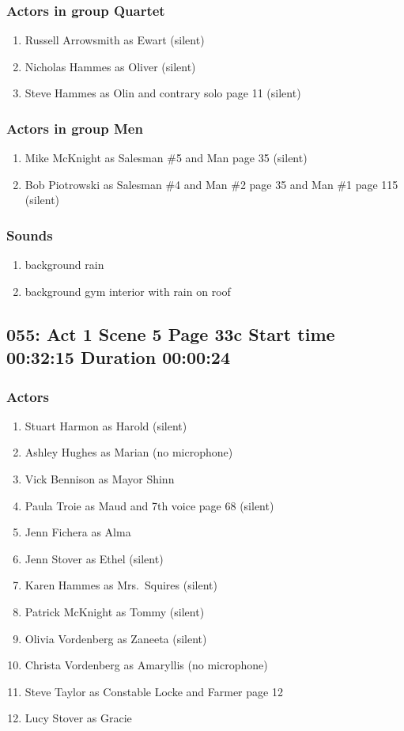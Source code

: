 \subsubsection{Actors in group Quartet}
\begin{enumerate}
\item Russell Arrowsmith as Ewart (silent)
\item Nicholas Hammes as Oliver (silent)
\item Steve Hammes as Olin and contrary solo page 11 (silent)
\end{enumerate}
\subsubsection{Actors in group Men}
\begin{enumerate}
\item Mike McKnight as Salesman \#5 and Man page 35 (silent)
\item Bob Piotrowski as Salesman \#4 and Man \#2 page 35 and Man \#1 page 115 (silent)
\end{enumerate}

\subsubsection{Sounds}
\begin{enumerate}
\item background rain
\item background gym interior with rain on roof
\end{enumerate}
\subsection{055: Act 1 Scene 5 Page 33c Start time 00:32:15 Duration 00:00:24}

\subsubsection{Actors}
\begin{enumerate}
\item Stuart Harmon as Harold (silent)
\item Ashley Hughes as Marian (no microphone)
\item Vick Bennison as Mayor Shinn
\item Paula Troie as Maud and 7th voice page 68 (silent)
\item Jenn Fichera as Alma
\item Jenn Stover as Ethel (silent)
\item Karen Hammes as Mrs.~Squires (silent)
\item Patrick McKnight as Tommy (silent)
\item Olivia Vordenberg as Zaneeta (silent)
\item Christa Vordenberg as Amaryllis (no microphone)
\item Steve Taylor as Constable Locke and Farmer page 12
\item Lucy Stover as Gracie
\end{enumerate}
